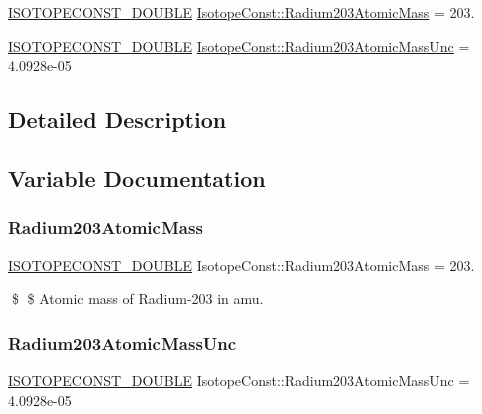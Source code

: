 \begin{DoxyCompactItemize}
\item 
\mbox{\hyperlink{group___isotope_const-_macros_ga8f45a7272ce02c0b4c65c44636ed719a}{I\+S\+O\+T\+O\+P\+E\+C\+O\+N\+S\+T\+\_\+\+D\+O\+U\+B\+LE}} \mbox{\hyperlink{group___isotope_const-_radium-_ra203_gaaef7b01dd6143d522d7d25758657d095}{Isotope\+Const\+::\+Radium203\+Atomic\+Mass}} = 203.
\item 
\mbox{\hyperlink{group___isotope_const-_macros_ga8f45a7272ce02c0b4c65c44636ed719a}{I\+S\+O\+T\+O\+P\+E\+C\+O\+N\+S\+T\+\_\+\+D\+O\+U\+B\+LE}} \mbox{\hyperlink{group___isotope_const-_radium-_ra203_ga5308ea53ef68c788833a4e8a80c6484d}{Isotope\+Const\+::\+Radium203\+Atomic\+Mass\+Unc}} = 4.\+0928e-\/05
\end{DoxyCompactItemize}


\subsection{Detailed Description}


\subsection{Variable Documentation}
\mbox{\label{group___isotope_const-_radium-_ra203_gaaef7b01dd6143d522d7d25758657d095}} 
\subsubsection{\texorpdfstring{Radium203\+Atomic\+Mass}{Radium203AtomicMass}}
{\footnotesize\ttfamily \mbox{\hyperlink{group___isotope_const-_macros_ga8f45a7272ce02c0b4c65c44636ed719a}{I\+S\+O\+T\+O\+P\+E\+C\+O\+N\+S\+T\+\_\+\+D\+O\+U\+B\+LE}} Isotope\+Const\+::\+Radium203\+Atomic\+Mass = 203.}

\$ \$ Atomic mass of Radium-\/203 in amu. \mbox{\label{group___isotope_const-_radium-_ra203_ga5308ea53ef68c788833a4e8a80c6484d}} 
\subsubsection{\texorpdfstring{Radium203\+Atomic\+Mass\+Unc}{Radium203AtomicMassUnc}}
{\footnotesize\ttfamily \mbox{\hyperlink{group___isotope_const-_macros_ga8f45a7272ce02c0b4c65c44636ed719a}{I\+S\+O\+T\+O\+P\+E\+C\+O\+N\+S\+T\+\_\+\+D\+O\+U\+B\+LE}} Isotope\+Const\+::\+Radium203\+Atomic\+Mass\+Unc = 4.\+0928e-\/05}

